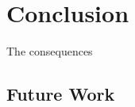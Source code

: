 \chapter{Conclusion}
\label{cha:conc}

The consequences 

\section{Future Work}
\label{sec:future}



